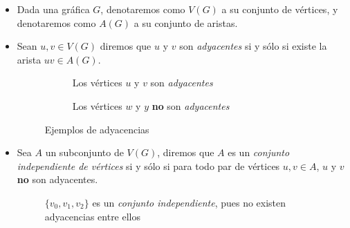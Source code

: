 \documentclass[12pt]{article}
\begin{document}
\begin{itemize}
\item Dada una gráfica $G$, denotaremos como $V(G)$ a su conjunto de vértices, y denotaremos como $A(G)$ a su conjunto de aristas.
\item Sean $u,v\in V(G)$ diremos que $u$ y $v$ son \textit{adyacentes} si y sólo si existe la arista $uv\in A(G)$.

  \begin{figure}[h!]
    \centering
    \begin{subfigure}[b]{0.3\textwidth}
      \centering
      \caption{Los vértices $u$ y $v$ son \textit{adyacentes}}
    \end{subfigure}
    \hfil
    \begin{subfigure}[b]{0.3\textwidth}
      \centering
      \caption{Los vértices $w$ y $y$ \textbf{no} son \textit{adyacentes}}
    \end{subfigure}
    \caption{Ejemplos de adyacencias}
  \end{figure}
  
\item Sea $A$ un subconjunto de $V(G)$, diremos que $A$ es un \textit{conjunto independiente de vértices} si y sólo si para todo par de vértices $u,v\in A$, $u$ y $v$ \textbf{no} son adyacentes.

  \begin{figure}[h!]
    \centering
    \caption{$\{v_0,v_1,v_2\}$ es un \textit{conjunto independiente}, pues no existen adyacencias entre ellos}
  \end{figure}


\end{itemize}
\end{document}
